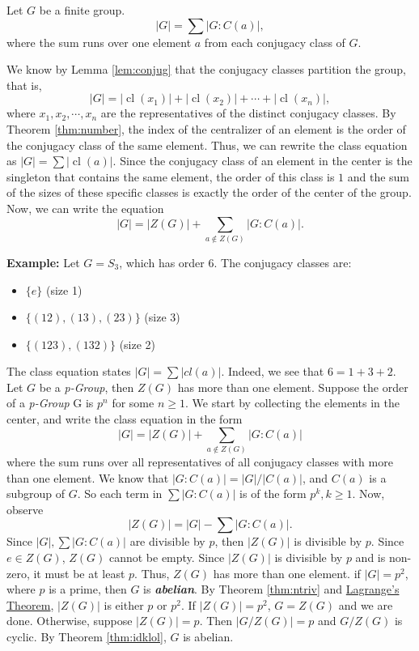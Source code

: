 \documentclass[a4paper,12pt]{article}
\begin{document}
{
    Let $G$ be a finite group. $$|G|=\sum |G:C(a)|,$$ where the sum runs over one element $a$ from each conjugacy class of $G$.
}
{
    We know by Lemma \ref{lem:conjug} that the conjugacy classes partition the group, that is, $$|G|=|\operatorname{cl}(x_1)|+ |\operatorname{cl}(x_2)|+\cdots+|\operatorname{cl}(x_n)|,$$ where $x_1,x_2,\cdots, x_n$ are the representatives of the distinct conjugacy classes.
    By Theorem \ref{thm:number}, the index of the centralizer of an element is the order of the conjugacy class of the same element. Thus, we can rewrite the class equation as $|G|=\sum |\operatorname{cl}(a)|.$
    Since the conjugacy class of an element in the center is the singleton that contains the same element, the order of this class is $1$ and the sum of the sizes of these specific classes is exactly the order of the center of the group. Now, we can write the equation
    \[|G|=|Z(G)|+\sum_{a\notin Z(G)}|G:C(a)|.\] 

}
\textbf{Example:} Let $G = S_3$, which has order 6. The conjugacy classes are:
\begin{itemize}
    \item $\{e\}$ (size 1)
    \item $\{(12), (13), (23)\}$ (size 3)
    \item $\{(123), (132)\}$ (size 2)
\end{itemize}
The class equation states $|G| = \sum |cl(a)|$. Indeed, we see that $6 = 1 + 3 + 2$.
{
    Let $G$ be a \textit{p-Group}, then $Z(G)$ has more than one element.
}
{
    Suppose the order of a \textit{p-Group} G is $p^n$ for some $n\ge 1.$ We start by collecting the elements in the center, and write the class equation in the form
    \[|G|=|Z(G)|+\sum_{a\notin Z(G)}|G:C(a)|\]
    where the sum runs over all representatives of all conjugacy classes with more than one element.
    We know that $|G:C(a)|=|G|/|C(a)|$, and $C(a)$ is a subgroup of $G$. So each term in $\sum|G:C(a)|$ is of the form $p^k, k\ge 1.$
    Now, observe
    \[|Z(G)|=|G|-\sum|G:C(a)|.\]
    Since $|G|, \sum|G:C(a)|$ are divisible by $p$, then $|Z(G)|$ is divisible by $p$. Since $e \in Z(G)$, $Z(G)$ cannot be empty. Since $|Z(G)|$ is divisible by $p$ and is non-zero, it must be at least $p$. Thus, $Z(G)$ has more than one element.
}
\corp{}{}
{
    if $|G|=p^2$, where $p$ is a prime, then $G$ is \textit{\textbf{abelian}}. 
}   
{
    By Theorem \ref{thm:ntriv} and \hyperref[thm:Lagrange]{Lagrange's Theorem}, $|Z(G)|$ is either $p$ or $p^2.$ If $|Z(G)|=p^2$, $G=Z(G)$ and we are done. Otherwise, suppose $|Z(G)|=p$. Then $|G/Z(G)|=p$ and $G/Z(G)$ is cyclic. By Theorem \ref{thm:idklol}, $G$ is abelian.
}
\end{document}
